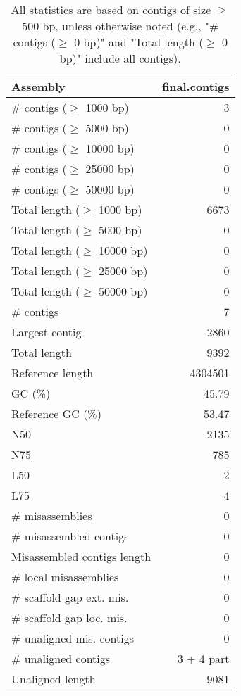 \documentclass[12pt,a4paper]{article}
\begin{document}
\begin{table}[ht]
\begin{center}
\caption{All statistics are based on contigs of size $\geq$ 500 bp, unless otherwise noted (e.g., "\# contigs ($\geq$ 0 bp)" and "Total length ($\geq$ 0 bp)" include all contigs).}
\begin{tabular}{|l*{1}{|r}|}
\hline
Assembly & final.contigs \\ \hline
\# contigs ($\geq$ 1000 bp) & 3 \\ \hline
\# contigs ($\geq$ 5000 bp) & 0 \\ \hline
\# contigs ($\geq$ 10000 bp) & 0 \\ \hline
\# contigs ($\geq$ 25000 bp) & 0 \\ \hline
\# contigs ($\geq$ 50000 bp) & 0 \\ \hline
Total length ($\geq$ 1000 bp) & 6673 \\ \hline
Total length ($\geq$ 5000 bp) & 0 \\ \hline
Total length ($\geq$ 10000 bp) & 0 \\ \hline
Total length ($\geq$ 25000 bp) & 0 \\ \hline
Total length ($\geq$ 50000 bp) & 0 \\ \hline
\# contigs & 7 \\ \hline
Largest contig & 2860 \\ \hline
Total length & 9392 \\ \hline
Reference length & 4304501 \\ \hline
GC (\%) & 45.79 \\ \hline
Reference GC (\%) & 53.47 \\ \hline
N50 & 2135 \\ \hline
N75 & 785 \\ \hline
L50 & 2 \\ \hline
L75 & 4 \\ \hline
\# misassemblies & 0 \\ \hline
\# misassembled contigs & 0 \\ \hline
Misassembled contigs length & 0 \\ \hline
\# local misassemblies & 0 \\ \hline
\# scaffold gap ext. mis. & 0 \\ \hline
\# scaffold gap loc. mis. & 0 \\ \hline
\# unaligned mis. contigs & 0 \\ \hline
\# unaligned contigs & 3 + 4 part \\ \hline
Unaligned length & 9081 \\ \hline

\end{tabular}
\end{center}
\end{table}
\end{document}
